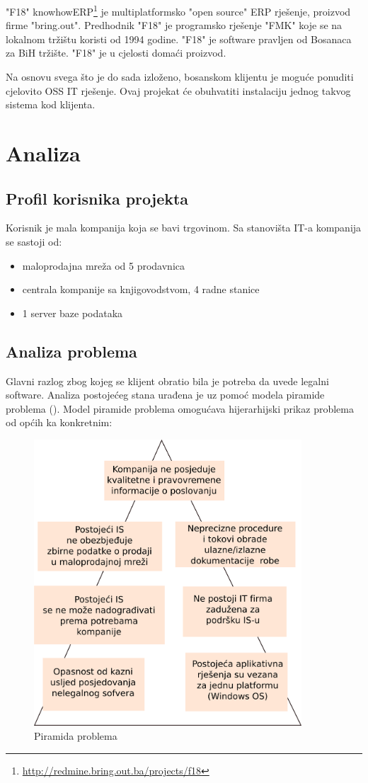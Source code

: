 \documentclass[times, utf8, seminar]{fit}
\begin{document}
"F18" knowhowERP\footnote{\url{http://redmine.bring.out.ba/projects/f18}} je multiplatformsko "open source" ERP rješenje, proizvod firme "bring.out". Predhodnik "F18" je programsko rješenje "FMK" koje se na lokalnom tržištu koristi od 1994 godine. "F18" je software pravljen od Bosanaca za BiH tržište. "F18" je u cjelosti domaći proizvod.

Na osnovu svega što je do sada izloženo, bosanskom klijentu je moguće ponuditi cjelovito OSS IT rješenje.  Ovaj projekat će obuhvatiti instalaciju jednog takvog sistema kod klijenta.

\chapter{Analiza}

\section{Profil korisnika projekta}
Korisnik je mala kompanija koja se bavi trgovinom. Sa stanovišta IT-a kompanija se sastoji od:
\begin{itemize}
  \item maloprodajna mreža od 5 prodavnica
  \item centrala kompanije sa knjigovodstvom, 4 radne stanice
  \item 1 server baze podataka 
\end{itemize}
\pagebreak
\section{Analiza problema}
Glavni razlog zbog kojeg se klijent obratio bila je potreba da uvede legalni software. Analiza postojećeg stana urađena je uz pomoć modela piramide problema (\cite{prasopro}). Model piramide problema omogućava hijerarhijski prikaz problema od općih ka konkretnim: 

\begin{figure}[H]
\centering
\includegraphics[width=10cm]{img/piramida_problema.png}
\caption{Piramida problema}
\end{figure}
\end{document}
